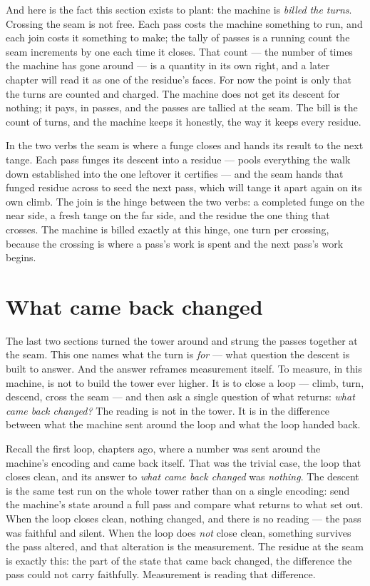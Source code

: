 And here is the fact this section exists to plant: the machine is \emph{billed the turns}. Crossing the seam is not
free. Each pass costs the machine something to run, and each join costs it something to make; the tally of passes is a
running count the seam increments by one each time it closes. That count --- the number of times the machine has gone
around --- is a quantity in its own right, and a later chapter will read it as one of the residue's faces. For now the
point is only that the turns are counted and charged. The machine does not get its descent for nothing; it pays, in
passes, and the passes are tallied at the seam. The bill is the count of turns, and the machine keeps it honestly, the
way it keeps every residue.

In the two verbs the seam is where a funge closes and hands its result to the next tange. Each pass funges its descent
into a residue --- pools everything the walk down established into the one leftover it certifies --- and the seam hands
that funged residue across to seed the next pass, which will tange it apart again on its own climb. The join is the hinge
between the two verbs: a completed funge on the near side, a fresh tange on the far side, and the residue the one thing
that crosses. The machine is billed exactly at this hinge, one turn per crossing, because the crossing is where a pass's
work is spent and the next pass's work begins.

\section{What came back changed}

The last two sections turned the tower around and strung the passes together at the seam. This one names what the turn
is \emph{for} --- what question the descent is built to answer. And the answer reframes measurement itself. To measure,
in this machine, is not to build the tower ever higher. It is to close a loop --- climb, turn, descend, cross the seam
--- and then ask a single question of what returns: \emph{what came back changed?} The reading is not in the tower. It
is in the difference between what the machine sent around the loop and what the loop handed back.

Recall the first loop, chapters ago, where a number was sent around the machine's encoding and came back itself. That
was the trivial case, the loop that closes clean, and its answer to \emph{what came back changed} was \emph{nothing}.
The descent is the same test run on the whole tower rather than on a single encoding: send the machine's state around a
full pass and compare what returns to what set out. When the loop closes clean, nothing changed, and there is no reading
--- the pass was faithful and silent. When the loop does \emph{not} close clean, something survives the pass altered,
and that alteration is the measurement. The residue at the seam is exactly this: the part of the state that came back
changed, the difference the pass could not carry faithfully. Measurement is reading that difference.

